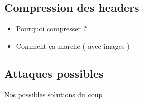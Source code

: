 	\subsection{Compression des headers}
		\begin{itemize}
			\item Pourquoi compresser ?
			\item Comment ça marche ( avec images )
		\end{itemize}
	
	
	\subsection{Attaques possibles}
	Nos possibles solutions du coup


